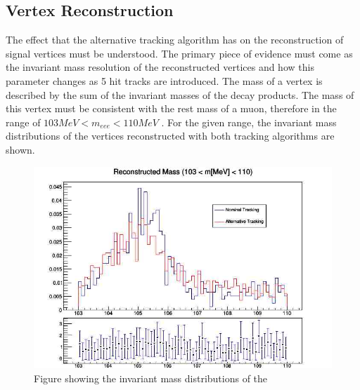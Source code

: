 \subsection{Vertex Reconstruction}
The effect that the alternative tracking algorithm has on the reconstruction of signal vertices must be understood.
The primary piece of evidence must come as the invariant mass resolution of the reconstructed vertices and how this parameter changes as 5 hit tracks are introduced.
The mass of a vertex is described by the sum of the invariant masses of the decay products.
The mass of this vertex must be consistent with the rest mass of a muon, therefore in the range of $103 MeV < m_{eee} < 110 MeV$ \cite{hesketh2022mu3e}.
For the given range, the invariant mass distributions of the vertices reconstructed with both tracking algorithms are shown.
\begin{figure}
    \centering
    \includegraphics[scale=0.5]{fig/tracking/mass_cut.jpeg}
    \caption{Figure showing the invariant mass distributions of the }
    \label{fig:mass_d}
\end{figure}
